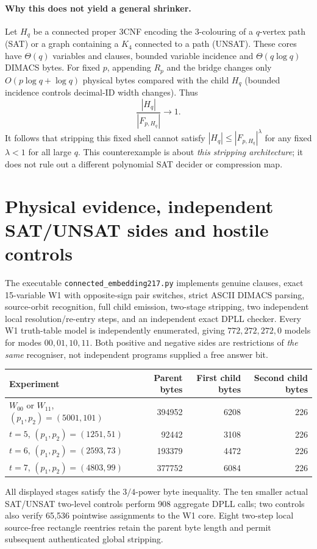 \documentclass[11pt]{article}
\begin{document}
\paragraph{Why this does not yield a general shrinker.}
Let $H_q$ be a connected proper 3CNF encoding the 3-colouring of a $q$-vertex path (SAT) or a graph containing a $K_4$ connected to a path (UNSAT). These cores have $\Theta(q)$ variables and clauses, bounded variable incidence and $\Theta(q\log q)$ DIMACS bytes. For fixed $p$, appending $R_p$ and the bridge changes only $O(p\log q+\log q)$ physical bytes compared with the child $H_q$ (bounded incidence controls decimal-ID width changes). Thus
\[
\frac{|H_q|}{|F_{p,H_q}|}\longrightarrow 1.
\]
It follows that stripping this fixed shell cannot satisfy $|H_q|\le |F_{p,H_q}|^\lambda$ for any fixed $\lambda<1$ for all large $q$. This counterexample is about \emph{this stripping architecture}; it does not rule out a different polynomial SAT decider or compression map.

\section{Physical evidence, independent SAT/UNSAT sides and hostile controls}
The executable \texttt{connected\_embedding217.py} implements genuine clauses, exact 15-variable W1 with opposite-sign pair switches, strict ASCII DIMACS parsing, source-orbit recognition, full child emission, two-stage stripping, two independent local resolution/re-entry steps, and an independent exact DPLL checker. Every W1 truth-table model is independently enumerated, giving $772,272,272,0$ models for modes $00,01,10,11$. Both positive and negative sides are restrictions of \emph{the same} recogniser, not independent programs supplied a free answer bit.

\begin{center}\small\begin{tabular}{lrrr}\toprule
Experiment & Parent bytes & First child bytes & Second child bytes\\\midrule
$W_{00}$ or $W_{11}$, $(p_1,p_2)=(5001,101)$ &394952&6208&226\\
$t=5$, $(p_1,p_2)=(1251,51)$ &92442&3108&226\\
$t=6$, $(p_1,p_2)=(2593,73)$ &193379&4472&226\\
$t=7$, $(p_1,p_2)=(4803,99)$ &377752&6084&226\\\bottomrule
\end{tabular}\end{center}
All displayed stages satisfy the $3/4$-power byte inequality. The ten smaller actual SAT/UNSAT two-level controls perform 908 aggregate DPLL calls; two controls also verify 65,536 pointwise assignments to the W1 core. Eight two-step local source-free rectangle reentries retain the parent byte length and permit subsequent authenticated global stripping.
\end{document}
